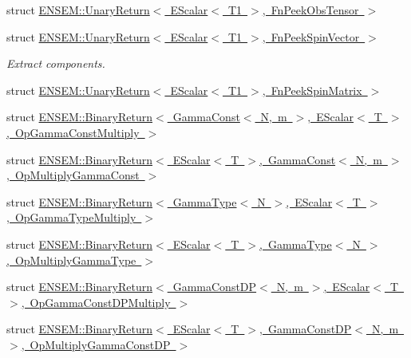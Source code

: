 \begin{DoxyCompactItemize}
struct \mbox{\hyperlink{structENSEM_1_1UnaryReturn_3_01EScalar_3_01T1_01_4_00_01FnPeekObsTensor_01_4}{E\+N\+S\+E\+M\+::\+Unary\+Return$<$ E\+Scalar$<$ T1 $>$, Fn\+Peek\+Obs\+Tensor $>$}}
\item 
struct \mbox{\hyperlink{structENSEM_1_1UnaryReturn_3_01EScalar_3_01T1_01_4_00_01FnPeekSpinVector_01_4}{E\+N\+S\+E\+M\+::\+Unary\+Return$<$ E\+Scalar$<$ T1 $>$, Fn\+Peek\+Spin\+Vector $>$}}
\begin{DoxyCompactList}\small\item\em Extract components. \end{DoxyCompactList}\item 
struct \mbox{\hyperlink{structENSEM_1_1UnaryReturn_3_01EScalar_3_01T1_01_4_00_01FnPeekSpinMatrix_01_4}{E\+N\+S\+E\+M\+::\+Unary\+Return$<$ E\+Scalar$<$ T1 $>$, Fn\+Peek\+Spin\+Matrix $>$}}
\item 
struct \mbox{\hyperlink{structENSEM_1_1BinaryReturn_3_01GammaConst_3_01N_00_01m_01_4_00_01EScalar_3_01T_01_4_00_01OpGammaConstMultiply_01_4}{E\+N\+S\+E\+M\+::\+Binary\+Return$<$ Gamma\+Const$<$ N, m $>$, E\+Scalar$<$ T $>$, Op\+Gamma\+Const\+Multiply $>$}}
\item 
struct \mbox{\hyperlink{structENSEM_1_1BinaryReturn_3_01EScalar_3_01T_01_4_00_01GammaConst_3_01N_00_01m_01_4_00_01OpMultiplyGammaConst_01_4}{E\+N\+S\+E\+M\+::\+Binary\+Return$<$ E\+Scalar$<$ T $>$, Gamma\+Const$<$ N, m $>$, Op\+Multiply\+Gamma\+Const $>$}}
\item 
struct \mbox{\hyperlink{structENSEM_1_1BinaryReturn_3_01GammaType_3_01N_01_4_00_01EScalar_3_01T_01_4_00_01OpGammaTypeMultiply_01_4}{E\+N\+S\+E\+M\+::\+Binary\+Return$<$ Gamma\+Type$<$ N $>$, E\+Scalar$<$ T $>$, Op\+Gamma\+Type\+Multiply $>$}}
\item 
struct \mbox{\hyperlink{structENSEM_1_1BinaryReturn_3_01EScalar_3_01T_01_4_00_01GammaType_3_01N_01_4_00_01OpMultiplyGammaType_01_4}{E\+N\+S\+E\+M\+::\+Binary\+Return$<$ E\+Scalar$<$ T $>$, Gamma\+Type$<$ N $>$, Op\+Multiply\+Gamma\+Type $>$}}
\item 
struct \mbox{\hyperlink{structENSEM_1_1BinaryReturn_3_01GammaConstDP_3_01N_00_01m_01_4_00_01EScalar_3_01T_01_4_00_01OpGammaConstDPMultiply_01_4}{E\+N\+S\+E\+M\+::\+Binary\+Return$<$ Gamma\+Const\+D\+P$<$ N, m $>$, E\+Scalar$<$ T $>$, Op\+Gamma\+Const\+D\+P\+Multiply $>$}}
\item 
struct \mbox{\hyperlink{structENSEM_1_1BinaryReturn_3_01EScalar_3_01T_01_4_00_01GammaConstDP_3_01N_00_01m_01_4_00_01OpMultiplyGammaConstDP_01_4}{E\+N\+S\+E\+M\+::\+Binary\+Return$<$ E\+Scalar$<$ T $>$, Gamma\+Const\+D\+P$<$ N, m $>$, Op\+Multiply\+Gamma\+Const\+D\+P $>$}}

\end{DoxyCompactItemize}
